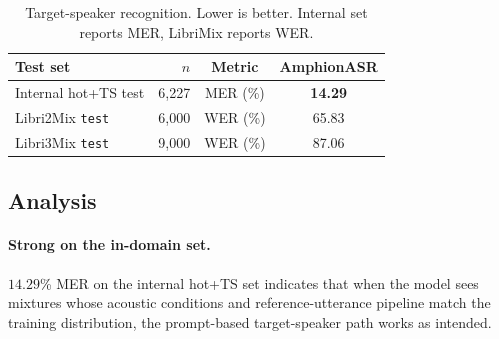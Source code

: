 \begin{table}[t]
  \caption{Target-speaker recognition. Lower is better. Internal set
    reports MER, LibriMix reports WER.}
  \label{tab:tsasr}
  \centering
  \small
  \begin{tabular}{lrcc}
    \toprule
    Test set & $n$ & Metric & \textbf{AmphionASR} \\
    \midrule
    Internal hot+TS test            & 6{,}227 & MER (\%) & \textbf{14.29} \\
    Libri2Mix \texttt{test}         & 6{,}000 & WER (\%) & 65.83 \\
    Libri3Mix \texttt{test}         & 9{,}000 & WER (\%) & 87.06 \\
    \bottomrule
  \end{tabular}
\end{table}

\subsection{Analysis}

\paragraph{Strong on the in-domain set.}
$14.29$\% MER on the internal hot+TS set indicates that when the model
sees mixtures whose acoustic conditions and reference-utterance pipeline
match the training distribution, the prompt-based target-speaker path
works as intended.

